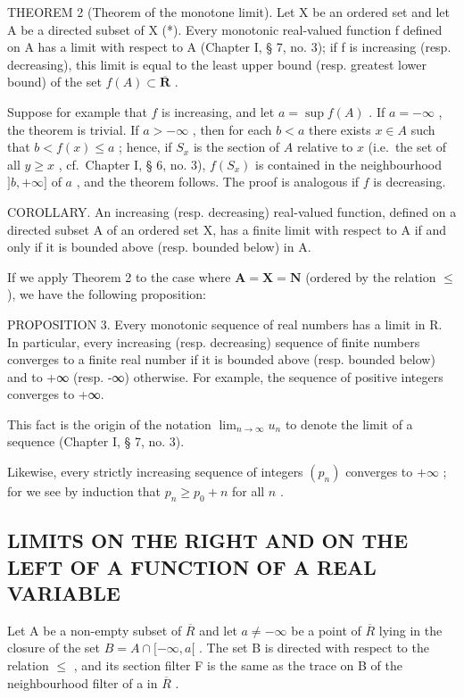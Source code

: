 THEOREM 2 (Theorem of the monotone limit). Let X be an ordered set and let A be a directed subset of X (*). Every monotonic real-valued function f defined on A has a limit with respect to A (Chapter I, § 7, no. 3); if f is increasing (resp. decreasing), this limit is equal to the least upper bound (resp. greatest lower bound) of the set \(f(A) \subset \overline{\mathbf{R}}\) .

Suppose for example that \(f\) is increasing, and let \(a = \sup f(A)\) . If \(a = -\infty\) , the theorem is trivial. If \(a > -\infty\) , then for each \(b < a\) there exists \(x \in A\) such that \(b < f(x) \leqslant a\) ; hence, if \(S_x\) is the section of \(A\) relative to \(x\) (i.e.~the set of all \(y \geqslant x\) , cf.~Chapter I, § 6, no. 3), \(f(S_x)\) is contained in the neighbourhood \(]b, +\infty]\) of \(a\) , and the theorem follows. The proof is analogous if \(f\) is decreasing.

COROLLARY. An increasing (resp. decreasing) real-valued function, defined on a directed subset A of an ordered set X, has a finite limit with respect to A if and only if it is bounded above (resp. bounded below) in A.

If we apply Theorem 2 to the case where \(\mathbf{A} = \mathbf{X} = \mathbf{N}\) (ordered by the relation \(\leqslant\) ), we have the following proposition:

PROPOSITION 3. Every monotonic sequence of real numbers has a limit in R. In particular, every increasing (resp. decreasing) sequence of finite numbers converges to a finite real number if it is bounded above (resp. bounded below) and to +∞ (resp. -∞) otherwise. For example, the sequence of positive integers converges to +∞.

This fact is the origin of the notation \(\lim_{n\to \infty}u_n\) to denote the limit of a sequence (Chapter I, § 7, no. 3).

Likewise, every strictly increasing sequence of integers \((p_n)\) converges to \(+\infty\) ; for we see by induction that \(p_n \geqslant p_0 + n\) for all \(n\) .

\subsection{LIMITS ON THE RIGHT AND ON THE LEFT OF A FUNCTION OF A REAL VARIABLE}

Let A be a non-empty subset of \(\overline{R}\) and let \(a \neq -\infty\) be a point of \(\overline{R}\) lying in the closure of the set \(B = A \cap [-\infty, a[\) . The set B is directed with respect to the relation \(\leqslant\) , and its section filter F is the same as the trace on B of the neighbourhood filter of a in \(\overline{R}\) .


